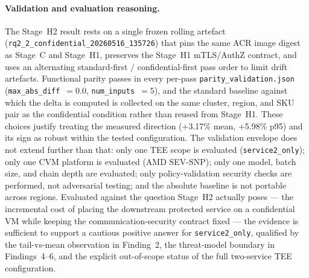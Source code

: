 \paragraph{Validation and evaluation reasoning.}
The Stage~H2 result rests on a single frozen rolling artefact
(\texttt{rq2\_2\_confidential\_20260516\_135726}) that pins the same ACR
image digest as Stage~C and Stage~H1, preserves the Stage~H1 mTLS/AuthZ contract,
and uses an alternating standard-first / confidential-first pass order
to limit drift artefacts. Functional parity passes in every per-pass
\texttt{parity\_validation.json} (\texttt{max\_abs\_diff}~$=0.0$,
\texttt{num\_inputs}~$=5$), and the standard baseline against which the
delta is computed is collected on the same cluster, region, and SKU
pair as the confidential condition rather than reused from Stage~H1. These
choices justify treating the measured direction (+3.17\% mean,
+5.98\% p95) and its sign as robust within the tested configuration.
The validation envelope does not extend further than that: only one
TEE scope is evaluated (\texttt{service2\_only}); only one CVM platform
is evaluated (AMD SEV-SNP); only one model, batch size, and chain depth
are evaluated; only policy-validation security checks are performed,
not adversarial testing; and the absolute baseline is not portable
across regions. Evaluated against the question Stage~H2 actually poses ---
the incremental cost of placing the downstream protected service on a
confidential VM while keeping the communication-security contract
fixed --- the evidence is sufficient to support a cautious positive
answer for \texttt{service2\_only}, qualified by the tail-vs-mean
observation in Finding~2, the threat-model boundary in Findings~4--6,
and the explicit out-of-scope status of the full two-service TEE
configuration.

